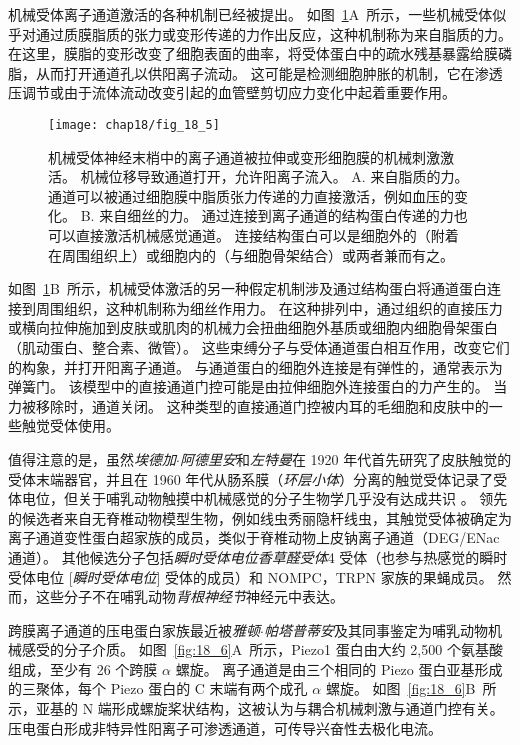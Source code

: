 机械受体离子通道激活的各种机制已经被提出。
如图~\ref{fig:18_5}A~所示，一些机械受体似乎对通过质膜脂质的张力或变形传递的力作出反应，这种机制称为来自脂质的力。
在这里，膜脂的变形改变了细胞表面的曲率，将受体蛋白中的疏水残基暴露给膜磷脂，从而打开通道孔以供阳离子流动。
这可能是检测细胞肿胀的机制，它在渗透压调节或由于流体流动改变引起的血管壁剪切应力变化中起着重要作用。


\begin{figure}[htbp]
	\centering
	\texttt{[image: chap18/fig\_18\_5]}
	\caption{机械受体神经末梢中的离子通道被拉伸或变形细胞膜的机械刺激激活。
		机械位移导致通道打开，允许阳离子流入\cite{lin2005trp}。
		A. 来自脂质的力。
		通道可以被通过细胞膜中脂质张力传递的力直接激活，例如血压的变化。
		B. 来自细丝的力。
		通过连接到离子通道的结构蛋白传递的力也可以直接激活机械感觉通道。
		连接结构蛋白可以是细胞外的（附着在周围组织上）或细胞内的（与细胞骨架结合）或两者兼而有之。}
	\label{fig:18_5}
\end{figure}


如图~\ref{fig:18_5}B~所示，机械受体激活的另一种假定机制涉及通过结构蛋白将通道蛋白连接到周围组织，这种机制称为细丝作用力。
在这种排列中，通过组织的直接压力或横向拉伸施加到皮肤或肌肉的机械力会扭曲细胞外基质或细胞内细胞骨架蛋白（肌动蛋白、整合素、微管）。
这些束缚分子与受体通道蛋白相互作用，改变它们的构象，并打开阳离子通道。
与通道蛋白的细胞外连接是有弹性的，通常表示为弹簧门。
该模型中的直接通道门控可能是由拉伸细胞外连接蛋白的力产生的。
当力被移除时，通道关闭。
这种类型的直接通道门控被内耳的毛细胞和皮肤中的一些触觉受体使用。


值得注意的是，虽然\textit{埃德加$\cdot$阿德里安}和\textit{左特曼}在 1920 年代首先研究了皮肤触觉的受体末端器官，并且在 1960 年代从肠系膜（\textit{环层小体}）分离的触觉受体记录了受体电位，但关于哺乳动物触摸中机械感觉的分子生物学几乎没有达成共识 。
领先的候选者来自无脊椎动物模型生物，例如线虫秀丽隐杆线虫，其触觉受体被确定为离子通道变性蛋白超家族的成员，类似于脊椎动物上皮钠离子通道（DEG/ENac 通道）。
其他候选分子包括\textit{瞬时受体电位香草醛受体}4 受体（也参与热感觉的瞬时受体电位 [\textit{瞬时受体电位}] 受体的成员）和 NOMPC，TRPN 家族的果蝇成员。
然而，这些分子不在哺乳动物\textit{背根神经节}神经元中表达。


跨膜离子通道的压电蛋白家族最近被\textit{雅顿$\cdot$帕塔普蒂安}及其同事鉴定为哺乳动物机械感受的分子介质。
如图~\ref{fig:18_6}A~所示，Piezo1 蛋白由大约 2,500 个氨基酸组成，至少有 26 个跨膜 $\alpha$ 螺旋。
离子通道是由三个相同的 Piezo 蛋白亚基形成的三聚体，每个 Piezo 蛋白的 C 末端有两个成孔 $\alpha$ 螺旋。
如图~\ref{fig:18_6}B~所示，亚基的 N 端形成螺旋桨状结构，这被认为与耦合机械刺激与通道门控有关。
压电蛋白形成非特异性阳离子可渗透通道，可传导兴奋性去极化电流。



